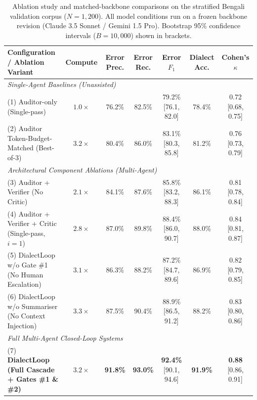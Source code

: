 
\begin{table}[t]
\centering
\small
\caption{Ablation study and matched-backbone comparisons on the stratified Bengali validation corpus ($N=1{,}200$). All model conditions run on a frozen backbone revision (Claude 3.5 Sonnet / Gemini 1.5 Pro). Bootstrap 95\% confidence intervals ($B=10{,}000$) shown in brackets.}
\label{tab:ablation_study}
\begin{tabular}{lcccccc}
\toprule
\textbf{Configuration / Ablation Variant} & \textbf{Compute} & \textbf{Error Prec.} & \textbf{Error Rec.} & \textbf{Error $F_1$} & \textbf{Dialect Acc.} & \textbf{Cohen's $\kappa$} \\
\midrule
\multicolumn{7}{l}{\textit{Single-Agent Baselines (Unassisted)}} \\
(1) Auditor-only (Single-pass) & $1.0\times$ & 76.2\% & 82.5\% & 79.2\% [76.1, 82.0] & 78.4\% & 0.72 [0.68, 0.75] \\
(2) Auditor Token-Budget-Matched (Best-of-3) & $3.2\times$ & 80.4\% & 86.0\% & 83.1\% [80.3, 85.8] & 81.2\% & 0.76 [0.73, 0.79] \\
\midrule
\multicolumn{7}{l}{\textit{Architectural Component Ablations (Multi-Agent)}} \\
(3) Auditor + Verifier (No Critic) & $2.1\times$ & 84.1\% & 87.6\% & 85.8\% [83.2, 88.3] & 86.1\% & 0.81 [0.78, 0.84] \\
(4) Auditor + Verifier + Critic (Single-pass, $i=1$) & $2.8\times$ & 87.0\% & 89.8\% & 88.4\% [86.0, 90.7] & 88.0\% & 0.84 [0.81, 0.87] \\
(5) DialectLoop w/o Gate \#1 (No Human Escalation) & $3.1\times$ & 86.3\% & 88.2\% & 87.2\% [84.7, 89.6] & 86.9\% & 0.82 [0.79, 0.85] \\
(6) DialectLoop w/o Summariser (No Context Injection) & $3.3\times$ & 87.5\% & 90.4\% & 88.9\% [86.5, 91.2] & 88.2\% & 0.83 [0.80, 0.86] \\
\midrule
\multicolumn{7}{l}{\textit{Full Multi-Agent Closed-Loop Systems}} \\
(7) \textbf{DialectLoop (Full Cascade + Gates \#1 \& \#2)} & $3.2\times$ & \textbf{91.8\%} & \textbf{93.0\%} & \textbf{92.4\%} [90.1, 94.6] & \textbf{91.9\%} & \textbf{0.88} [0.86, 0.91] \\
\bottomrule
\end{tabular}
\end{table}
